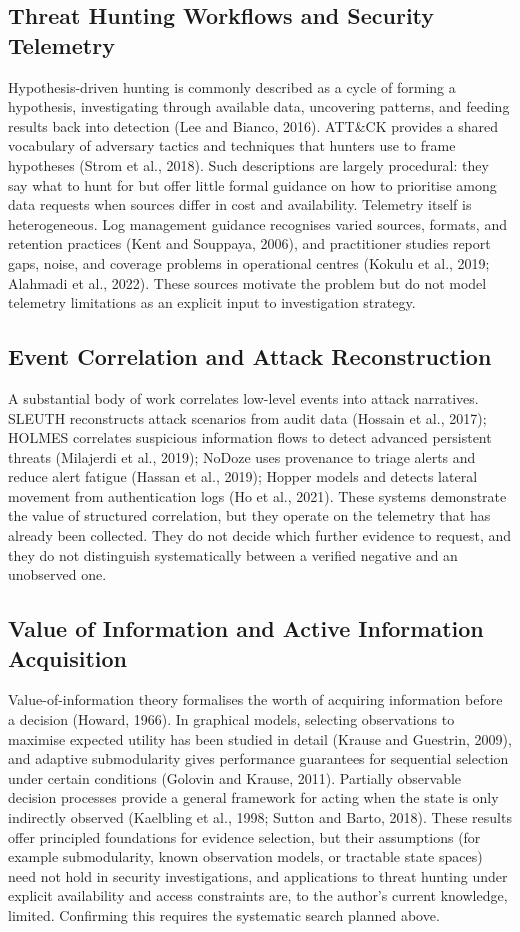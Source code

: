 \documentclass[a4paper,11pt,oneside]{article}
\begin{document}
\subsection{Threat Hunting Workflows and Security Telemetry}
Hypothesis-driven hunting is commonly described as a cycle of forming a hypothesis, investigating through available data, uncovering patterns, and feeding results back into detection (Lee and Bianco, 2016). ATT\&CK provides a shared vocabulary of adversary tactics and techniques that hunters use to frame hypotheses (Strom et al., 2018). Such descriptions are largely procedural: they say what to hunt for but offer little formal guidance on how to prioritise among data requests when sources differ in cost and availability. Telemetry itself is heterogeneous. Log management guidance recognises varied sources, formats, and retention practices (Kent and Souppaya, 2006), and practitioner studies report gaps, noise, and coverage problems in operational centres (Kokulu et al., 2019; Alahmadi et al., 2022). These sources motivate the problem but do not model telemetry limitations as an explicit input to investigation strategy.
\subsection{Event Correlation and Attack Reconstruction}
A substantial body of work correlates low-level events into attack narratives. SLEUTH reconstructs attack scenarios from audit data (Hossain et al., 2017); HOLMES correlates suspicious information flows to detect advanced persistent threats (Milajerdi et al., 2019); NoDoze uses provenance to triage alerts and reduce alert fatigue (Hassan et al., 2019); Hopper models and detects lateral movement from authentication logs (Ho et al., 2021). These systems demonstrate the value of structured correlation, but they operate on the telemetry that has already been collected. They do not decide which further evidence to request, and they do not distinguish systematically between a verified negative and an unobserved one.
\subsection{Value of Information and Active Information Acquisition}
Value-of-information theory formalises the worth of acquiring information before a decision (Howard, 1966). In graphical models, selecting observations to maximise expected utility has been studied in detail (Krause and Guestrin, 2009), and adaptive submodularity gives performance guarantees for sequential selection under certain conditions (Golovin and Krause, 2011). Partially observable decision processes provide a general framework for acting when the state is only indirectly observed (Kaelbling et al., 1998; Sutton and Barto, 2018). These results offer principled foundations for evidence selection, but their assumptions (for example submodularity, known observation models, or tractable state spaces) need not hold in security investigations, and applications to threat hunting under explicit availability and access constraints are, to the author’s current knowledge, limited. Confirming this requires the systematic search planned above.
\end{document}
